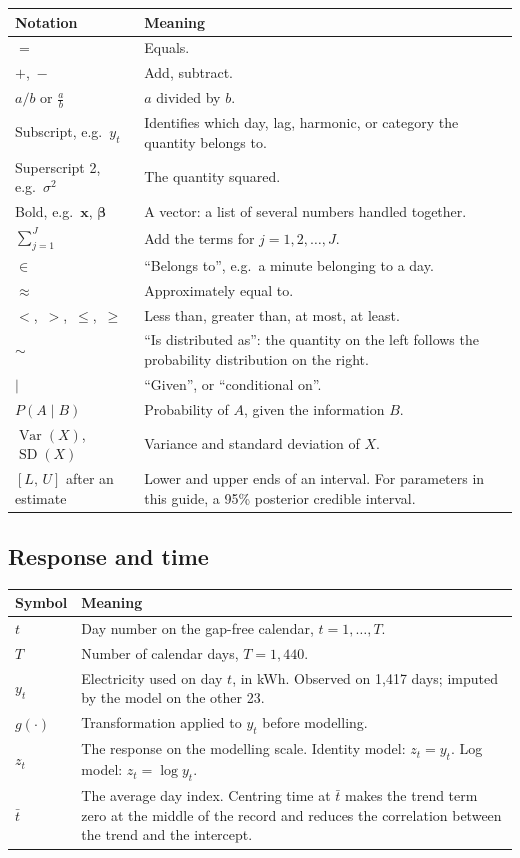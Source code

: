 \documentclass[11pt]{article}
\makeatletter
\DeclareMathOperator{\Var}{Var}
\DeclareMathOperator{\SD}{SD}
\newenvironment{reftable}[3]
  {\par\nopagebreak\addvspace{4pt}\noindent
   \renewcommand{\arraystretch}{1.3}%
   \begin{tabular}{@{}>{\raggedright\arraybackslash}p{#1\textwidth}
                      >{\raggedright\arraybackslash}p{\dimexpr0.97\textwidth-#1\textwidth-2\tabcolsep\relax}@{}}
   \toprule \textbf{#2} & \textbf{#3} \\ \midrule}
  {\bottomrule\end{tabular}\par\addvspace{8pt}}
\makeatother
\begin{document}
\begin{reftable}{0.25}{Notation}{Meaning}
$=$ & Equals. \\
$+$,\ $-$ & Add, subtract. \\
$a/b$ or $\frac{a}{b}$ & $a$ divided by $b$. \\
Subscript, e.g.\ $y_t$ & Identifies which day, lag, harmonic, or category the quantity belongs to. \\
Superscript 2, e.g.\ $\sigma^2$ & The quantity squared. \\
Bold, e.g.\ $\mathbf{x}$, $\boldsymbol\beta$ & A vector: a list of several numbers handled together. \\
$\sum_{j=1}^{J}$ & Add the terms for $j = 1, 2, \ldots, J$. \\
$\in$ & ``Belongs to'', e.g.\ a minute belonging to a day. \\
$\approx$ & Approximately equal to. \\
$<$,\ $>$,\ $\le$,\ $\ge$ & Less than, greater than, at most, at least. \\
$\sim$ & ``Is distributed as'': the quantity on the left follows the probability distribution on the right. \\
$\mid$ & ``Given'', or ``conditional on''. \\
$P(A \mid B)$ & Probability of $A$, given the information $B$. \\
$\Var(X)$,\ $\SD(X)$ & Variance and standard deviation of $X$. \\
$[L,\,U]$ after an estimate & Lower and upper ends of an interval. For parameters in this guide, a 95\% posterior credible interval. \\
\end{reftable}

\subsection{Response and time}

\begin{reftable}{0.2}{Symbol}{Meaning}
$t$ & Day number on the gap-free calendar, $t = 1, \ldots, T$. \\
$T$ & Number of calendar days, $T = 1{,}440$. \\
$y_t$ & Electricity used on day $t$, in kWh. Observed on 1,417 days; imputed by the model on the other 23. \\
$g(\cdot)$ & Transformation applied to $y_t$ before modelling. \\
$z_t$ & The response on the modelling scale. Identity model: $z_t = y_t$. Log model: $z_t = \log y_t$. \\
$\bar t$ & The average day index. Centring time at $\bar t$ makes the trend term zero at the middle of the record and reduces the correlation between the trend and the intercept. \\
\end{reftable}
\end{document}
